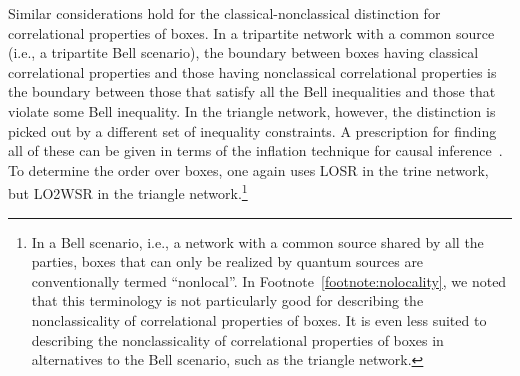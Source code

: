 \documentclass[12pt]{article}
\theoremstyle{plain}
\theoremstyle{definition}
\begin{document}
\begin{appendices}
Similar considerations hold for the classical-nonclassical distinction for correlational properties of boxes.  In a tripartite network with a common source (i.e., a tripartite Bell scenario), the boundary between boxes having classical correlational properties and those having nonclassical correlational properties is the boundary between those that satisfy all the Bell inequalities and those that violate some Bell inequality.  In the triangle network, however, the distinction is picked out by a different set of inequality constraints.  A prescription for finding all of these 
 can be given in terms of the inflation technique for causal inference~\cite{Wolfe2016inflation,WolfeNavascues}. To determine the order over boxes, 
   one again uses LOSR in the trine network,
    but LO2WSR in the triangle network.\footnote{In a Bell scenario, i.e., a network with a common source shared by all the parties, boxes that can only be realized by quantum sources are conventionally termed ``nonlocal''.  In Footnote~\ref{footnote:nolocality}, we noted that this terminology is not particularly good for describing the nonclassicality of correlational properties of boxes.  It is even less suited to describing the nonclassicality of correlational properties of boxes in alternatives to the Bell scenario, such as the triangle network.  
    } 
    
\end{appendices}
\end{document}
